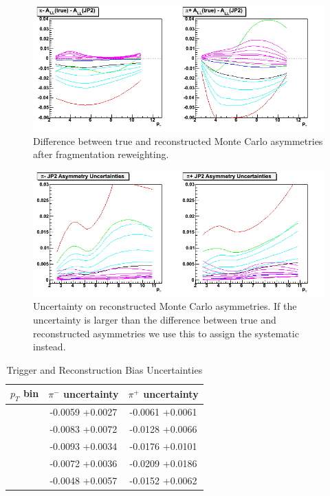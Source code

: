 \begin{figure}
  \includegraphics[width=\textwidth]{figures/mcasym_run5_diff_rescaled}
  \caption{Difference between true and reconstructed Monte Carlo
  asymmetries after fragmentation reweighting.}
  \label{fig:mcasym-diff}
\end{figure}

\begin{figure}
  \includegraphics[width=\textwidth]{figures/mcasym_run5_sigma_rescaled}
  \caption{Uncertainty on reconstructed Monte Carlo asymmetries. If the
  uncertainty is larger than the difference between true and reconstructed
  asymmetries we use this to assign the systematic instead.}
  \label{fig:mcasym-sigma}
\end{figure}

\begin{table}[ht]
    \begin{center}
        \begin{tabular}{c|c|c}
        \hline
        $p_{T}$ bin & $\pi^{-}$ uncertainty & $\pi^{+}$ uncertainty\\
        \hline
        \hline
        [2.00 - 3.18] & -0.0059 +0.0027 & -0.0061 +0.0061\\
        \hline
        [3.18 - 4.56] & -0.0083 +0.0072 & -0.0128 +0.0066\\
        \hline
        [4.56 - 6.32] & -0.0093 +0.0034 & -0.0176 +0.0101\\
        \hline
        [6.32 - 8.80] & -0.0072 +0.0036 & -0.0209 +0.0186\\
        \hline
        [8.80 - 12.84] & -0.0048 +0.0057 & -0.0152 +0.0062\\
    \hline
    \end{tabular}
    \end{center}
    \caption{Trigger and Reconstruction Bias Uncertainties}
    \label{tbl:trig-reco-bias}
\end{table}
